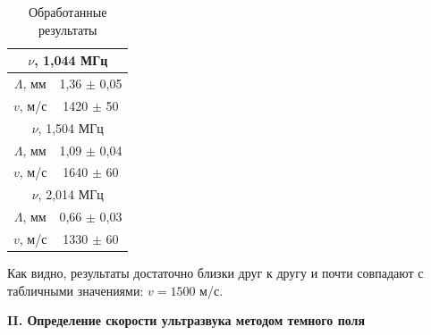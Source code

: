 \documentclass[a4paper,12pt]{article} %
\begin{document}
\begin{enumerate}
	\begin{table}[h!]
		\centering
		\begin{tabular}{|cc|}
			\hline
			\multicolumn{2}{|c|}{$\nu$, 1,044 МГц}                \\ \hline
			\multicolumn{1}{|c|}{$\Lambda$, мм} & 1,36 $\pm$ 0,05 \\ \hline
			\multicolumn{1}{|c|}{$v$, м/с}      & 1420 $\pm$ 50   \\ \hline
			\multicolumn{2}{|c|}{$\nu$, 1,504 МГц}                \\ \hline
			\multicolumn{1}{|c|}{$\Lambda$, мм} & 1,09 $\pm$ 0,04 \\ \hline
			\multicolumn{1}{|c|}{$v$, м/с}      & 1640 $\pm$ 60   \\ \hline
			\multicolumn{2}{|c|}{$\nu$, 2,014 МГц}                \\ \hline
			\multicolumn{1}{|c|}{$\Lambda$, мм} & 0,66 $\pm$ 0,03 \\ \hline
			\multicolumn{1}{|c|}{$v$, м/с}      & 1330 $\pm$ 60   \\ \hline
		\end{tabular}
		\caption{Обработанные результаты}
	\end{table}

	Как видно, результаты достаточно близки друг к другу и почти совпадают с табличными значениями: $v = 1500$ м/с.
		
	\end{enumerate}

	\newpage
	
	\begin{center}
		\textbf{II. Определение скорости ультразвука методом темного поля}
	\end{center}
\end{document}
